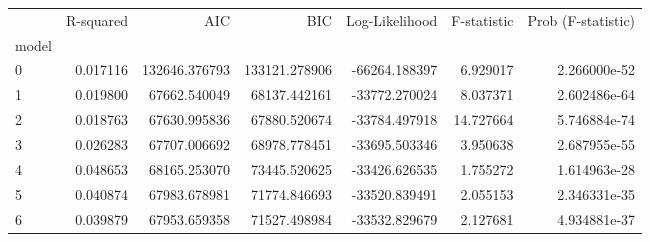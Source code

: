 \begin{tabular}{lrrrrrr}
\toprule
{} &  R-squared &            AIC &            BIC &  Log-Likelihood &  F-statistic &  Prob (F-statistic) \\
model &            &                &                &                 &              &                     \\
\midrule
0     &   0.017116 &  132646.376793 &  133121.278906 &   -66264.188397 &     6.929017 &        2.266000e-52 \\
1     &   0.019800 &   67662.540049 &   68137.442161 &   -33772.270024 &     8.037371 &        2.602486e-64 \\
2     &   0.018763 &   67630.995836 &   67880.520674 &   -33784.497918 &    14.727664 &        5.746884e-74 \\
3     &   0.026283 &   67707.006692 &   68978.778451 &   -33695.503346 &     3.950638 &        2.687955e-55 \\
4     &   0.048653 &   68165.253070 &   73445.520625 &   -33426.626535 &     1.755272 &        1.614963e-28 \\
5     &   0.040874 &   67983.678981 &   71774.846693 &   -33520.839491 &     2.055153 &        2.346331e-35 \\
6     &   0.039879 &   67953.659358 &   71527.498984 &   -33532.829679 &     2.127681 &        4.934881e-37 \\
\bottomrule
\end{tabular}
